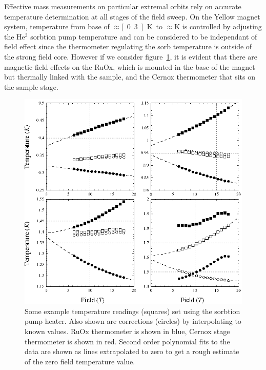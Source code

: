Effective mass measurements on particular extremal orbits rely on accurate temperature determination at all stages of the field sweep. On the Yellow magnet system, temperature from base of $\approx$\unit[0.3]{K} to $\approx$\unit[2]{K} is controlled by adjusting the He$^3$ sorbtion pump temperature and can be considered to be independant of field effect since the thermometer regulating the sorb temperature is outside of the strong field core. However if we consider figure~\ref{Fig:Exp:TemperatureCorrection}, it is evident that there are magnetic field effects on the RuOx, which is mounted in the base of the magnet but thermally linked with the sample, and the Cernox thermometer that sits on the sample stage.
\begin{figure}[htbp]
    \begin{center}
        \includegraphics[scale=0.9]{Chapter-dHvABaFe2P2/Figures/Mass/TemperatureCorrection/TemperatureCorrection}
        \caption{Some example temperature readings (squares) set using the sorbtion pump heater. Also shown are corrections (circles) by interpolating to known values. RuOx thermometer is shown in blue, Cernox stage thermometer is shown in red. Second order polynomial fits to the data are shown as lines extrapolated to zero to get a rough estimate of the zero field temperature value.}
        \label{Fig:Exp:TemperatureCorrection}
    \end{center}
\end{figure}
